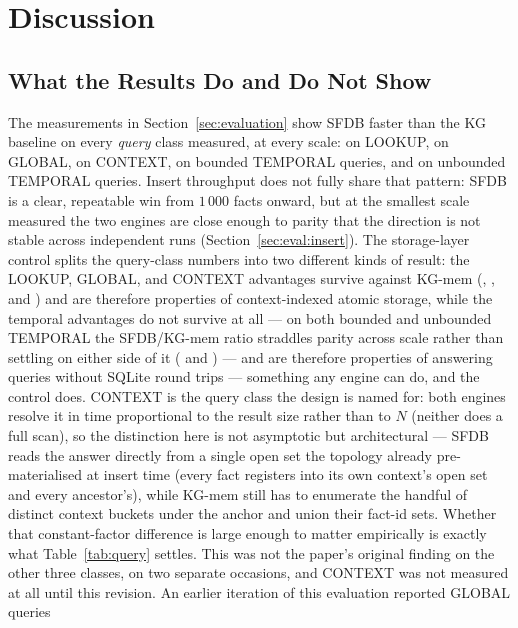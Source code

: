\section{Discussion}
\label{sec:discussion}

\subsection{What the Results Do and Do Not Show}
\label{sec:discussion:interpretation}

The measurements in Section~\ref{sec:evaluation} show SFDB faster than the
KG baseline on every \emph{query} class measured, at every scale:
\rangelookupkg{} on LOOKUP,
\rangeglobalkg{} on GLOBAL, \rangecontextkg{} on CONTEXT,
\rangetemporalkg{} on bounded TEMPORAL
queries, and \rangetemporalunbkg{} on unbounded TEMPORAL queries. Insert
throughput does not fully share that pattern: SFDB is a clear,
repeatable win from $1\,000$ facts onward, but at the smallest scale
measured the two engines are close enough to parity that the direction
is not stable across independent runs
(Section~\ref{sec:eval:insert}). The storage-layer control
splits the query-class numbers into two different kinds of result: the LOOKUP,
GLOBAL, and CONTEXT advantages survive against KG-mem (\rangelookupkgmem{},
\rangeglobalkgmem{}, and \rangecontextkgmem{}) and are therefore properties
of context-indexed
atomic storage, while the temporal advantages do not survive at all ---
on both bounded and unbounded TEMPORAL the SFDB/KG-mem ratio straddles
parity across scale rather than settling on either side of it
(\rangetemporalkgmem{} and \rangetemporalunbkgmem{}) --- and are therefore
properties of answering queries without SQLite round trips --- something
any engine can do, and the control does. CONTEXT is the query class the
design is named for: both engines resolve it in time proportional to the
result size rather than to $N$ (neither does a full scan), so the
distinction here is not asymptotic but architectural --- SFDB reads the
answer directly from a single open set the topology already
pre-materialised at insert time (every fact registers into its own
context's open set and every ancestor's), while KG-mem still has to
enumerate the handful of distinct context buckets under the anchor and
union their fact-id sets. Whether that constant-factor difference is
large enough to matter empirically is exactly what
Table~\ref{tab:query} settles. This was not the
paper's original finding on the other three classes, on two separate
occasions, and CONTEXT was not measured at all until this revision. An earlier iteration of this evaluation reported GLOBAL queries
